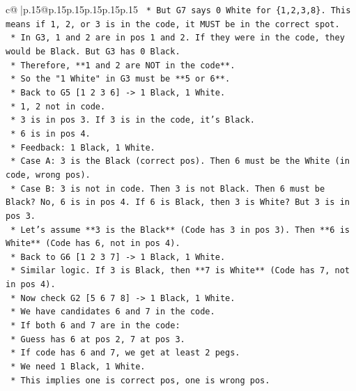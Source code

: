 \documentclass{article}
\begin{document}
{\begin{supertabular}{c@{$\;$}|p{.15\linewidth}@{}p{.15\linewidth}p{.15\linewidth}p{.15\linewidth}p{.15\linewidth}p{.15\linewidth}}
{{{\texttt{                *   But G7 says 0 White for \{1,2,3,8\}. This means if 1, 2, or 3 is in the code, it MUST be in the correct spot.} \\
\texttt{                *   In G3, 1 and 2 are in pos 1 and 2. If they were in the code, they would be Black. But G3 has 0 Black.} \\
\texttt{                *   Therefore, **1 and 2 are NOT in the code**.} \\
\texttt{                *   So the "1 White" in G3 must be **5 or 6**.} \\
\texttt{            *   Back to G5 {[}1 2 3 6{]} {-}> 1 Black, 1 White.} \\
\texttt{                *   1, 2 not in code.} \\
\texttt{                *   3 is in pos 3. If 3 is in the code, it's Black.} \\
\texttt{                *   6 is in pos 4.} \\
\texttt{                *   Feedback: 1 Black, 1 White.} \\
\texttt{                *   Case A: 3 is the Black (correct pos). Then 6 must be the White (in code, wrong pos).} \\
\texttt{                *   Case B: 3 is not in code. Then 3 is not Black. Then 6 must be Black? No, 6 is in pos 4. If 6 is Black, then 3 is White? But 3 is in pos 3.} \\
\texttt{                *   Let's assume **3 is the Black** (Code has 3 in pos 3). Then **6 is White** (Code has 6, not in pos 4).} \\
\texttt{            *   Back to G6 {[}1 2 3 7{]} {-}> 1 Black, 1 White.} \\
\texttt{                *   Similar logic. If 3 is Black, then **7 is White** (Code has 7, not in pos 4).} \\
\texttt{            *   Now check G2 {[}5 6 7 8{]} {-}> 1 Black, 1 White.} \\
\texttt{                *   We have candidates 6 and 7 in the code.} \\
\texttt{                *   If both 6 and 7 are in the code:} \\
\texttt{                    *   Guess has 6 at pos 2, 7 at pos 3.} \\
\texttt{                    *   If code has 6 and 7, we get at least 2 pegs.} \\
\texttt{                    *   We need 1 Black, 1 White.} \\
\texttt{                    *   This implies one is correct pos, one is wrong pos.} \\
}}}
\end{supertabular}}
\end{document}
